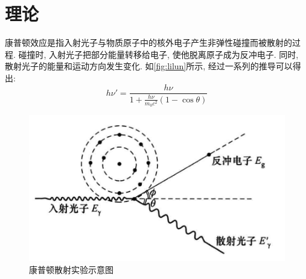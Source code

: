 \documentclass[font=default]{mpltx}
\begin{document}
\section{理论}
康普顿效应是指入射光子与物质原子中的核外电子产生非弹性碰撞而被散射的过程. 碰撞时, 入射光子把部分能量转移给电子, 使他脱离原子成为反冲电子. 同时, 散射光子的能量和运动方向发生变化. 
如\autoref{fig:lilun}所示, 经过一系列的推导可以得出: 
$$ 
h\nu' = \frac{h\nu}{1 + \frac{h\nu}{m_0 c^2}(1 - \cos\theta)}
$$
\begin{figure}
  \centering
  \includegraphics[width=0.5\linewidth]{fig/lilun.png}
  \caption{康普顿散射实验示意图}
  \label{fig:lilun}
\end{figure}
  
\end{document}
